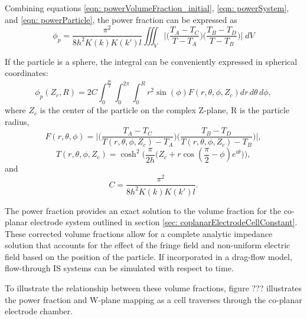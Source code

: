 Combining equations \ref{eqn: powerVolumeFraction_initial}, \ref{eqn: powerSystem}, and \ref{eqn: powerParticle}, the power fraction can be expressed as
\begin{equation}
    \phi_p = \frac{\pi^2 }{8h^2K(k)K(k')l}\iiint_V \bigg|\bigg(\frac{T_A-T_C}{T-T_A}\bigg)\bigg(\frac{T_B-T_D}{T-T_B}\bigg)\bigg| \;dV
    \label{eqn:power_fraction}
\end{equation}

\par If the particle is a sphere, the integral can be conveniently expressed in spherical coordinates:
\begin{equation}
    \phi_p(Z_c,R) = 2C\int_{0}^\frac{pi}{2}\int_0^{2\pi}\int_0^R r^2 \sin(\phi)F(r,\theta,\phi,Z_c)dr\,d\theta\,d\phi,
\end{equation}
\noindent where $Z_c$ is the center of the particle on the complex Z-plane, R is the particle radius,
\begin{equation}
    F(r,\theta,\phi) = \bigg|\bigg(\frac{T_A-T_C}{T(r,\theta,\phi,Z_c)-T_A}\bigg)\bigg(\frac{T_B-T_D}{T(r,\theta,\phi,Z_c)-T_B}\bigg)\bigg|,
\end{equation}
\begin{equation}
    T(r,\theta,\phi,Z_c) = \cosh^2\bigg(\frac{\pi}{2h}\Big(Z_c+r\cos(\frac{\pi}{2}-\phi)e^{i\theta}\Big)\bigg),
\end{equation}
\noindent and
\begin{equation}
    C = \frac{\pi^2}{8h^2K(k)K(k')l}.
\end{equation}

\par The power fraction provides an exact solution to the volume fraction for the co-planar electrode system outlined in section \ref{sec: coplanarElectrodeCellConstant}. These corrected volume fractions allow for a complete analytic impedance solution that accounts for the effect of the fringe field and non-uniform electric field based on the position of the particle. If incorporated in a drag-flow model, flow-through IS systems can be simulated with respect to time.

\par To illustrate the relationship between these volume fractions, figure ??? illustrates the power fraction and W-plane mapping as a cell traverses through the co-planar electrode chamber. 

